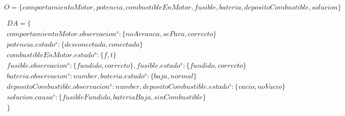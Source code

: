 \documentclass[10pt, a4paper,spanish]{article}
\begin{document}
		\begin{equation*}
			O = \{comportamientoMotor, potencia, combustibleEnMotor, fusible, bateria, depositoCombustible, solucion \}
		\end{equation*}

		\begin{multline*}
			DA = \{ \\
				comportamientoMotor.observacion^s:\{noArranca, sePara, correcto\} \\
				potencia.estado^s:\{desconectada, conectada\} \\
				combustibleEnMotor.estado^s:\{f, t\} \\
				fusible.observacion^s:\{fundido, correcto\}, fusible.estado^s:\{fundido, correcto\} \\
				bateria.observacion^s:number, bateria.estado^s:\{baja, normal\} \\
				depositoCombustible.observacion^s:number, depositoCombustible.estado^s:\{vacio, noVacio\} \\
				solucion.causa^s:\{fusibleFundido, bateriaBaja, sinCombustible\} \\
			\}
		\end{multline*}
\end{document}

